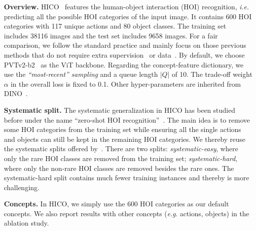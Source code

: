 \documentclass{article} \usepackage{iclr2022_conference,times}
\renewcommand{\paragraph}[1]{\noindent\textbf{#1.}}
\begin{document}
\paragraph{Overview} HICO~\citep{hico} features the human-object interaction (HOI) recognition, \emph{i.e.} predicting all the possible HOI categories of the input image. It contains 600 HOI categories with 117 unique actions and 80 object classes. The training set includes 38116 images and the test set includes 9658 images. For a fair comparison, we follow the standard practice and mainly focus on those previous methods that do not require extra supervision~\citep{fang2018pairwise} 
or data~\citep{li2020pastanet,li2019hake,jin2021object}.
By default, we choose PVTv2-b2~\citep{wang2021pvtv2} as the ViT backbone. Regarding the concept-feature dictionary, we use the \textit{``most-recent'' sampling} and a queue length $|Q|$ of 10. The trade-off weight $\alpha$ in the overall loss is fixed to 0.1. Other hyper-parameters are inherited from DINO~\citep{dino}.

\paragraph{Systematic split} The systematic generalization in HICO has been studied before under the name ``zero-shot HOI recognition''~\citep{zeroshothoi}. The main idea is to remove some HOI categories from the training set while ensuring all the single actions and objects can still be kept in the remaining HOI categories. We thereby reuse the systematic splits offered by~\cite{vcl}. There are two splits: \emph{systematic-easy}, where only the rare HOI classes are removed from the training set; \emph{systematic-hard}, where only the non-rare HOI classes are removed besides the rare ones.
The systematic-hard split contains much fewer training instances and thereby is more challenging.

\paragraph{Concepts} In HICO, we simply use the 600 HOI categories as our default concepts. 
We also report results with other concepts (\emph{e.g.} actions, objects) in the ablation study.
\end{document}
